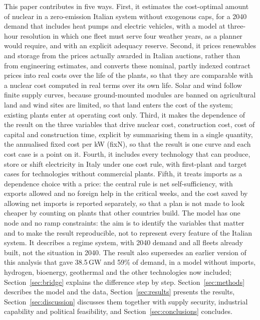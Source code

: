 This paper contributes in five ways. First, it estimates the cost-optimal amount of nuclear in a zero-emission Italian system without exogenous caps, for a 2040 demand that includes heat pumps and electric vehicles, with a model at three-hour resolution in which one fleet must serve four weather years, as a planner would require, and with an explicit adequacy reserve. Second, it prices renewables and storage from the prices actually awarded in Italian auctions, rather than from engineering estimates, and converts these nominal, partly indexed contract prices into real costs over the life of the plants, so that they are comparable with a nuclear cost computed in real terms over its own life. Solar and wind follow finite supply curves, because ground-mounted modules are banned on agricultural land and wind sites are limited, so that land enters the cost of the system; existing plants enter at operating cost only. Third, it makes the dependence of the result on the three variables that drive nuclear cost, construction cost, cost of capital and construction time, explicit by summarising them in a single quantity, the annualised fixed cost per kW (fixN), so that the result is one curve and each cost case is a point on it. Fourth, it includes every technology that can produce, store or shift electricity in Italy under one cost rule, with first-plant and target cases for technologies without commercial plants. Fifth, it treats imports as a dependence choice with a price: the central rule is net self-sufficiency, with exports allowed and no foreign help in the critical weeks, and the cost saved by allowing net imports is reported separately, so that a plan is not made to look cheaper by counting on plants that other countries build. The model has one node and no ramp constraints: the aim is to identify the variables that matter and to make the result reproducible, not to represent every feature of the Italian system. It describes a regime system, with 2040 demand and all fleets already built, not the situation in 2040. The result also supersedes an earlier version of this analysis that gave 38.5\,GW and 59\% of demand, in a model without imports, hydrogen, bioenergy, geothermal and the other technologies now included; Section~\ref{sec:bridge} explains the difference step by step. Section~\ref{sec:methods} describes the model and the data, Section~\ref{sec:results} presents the results, Section~\ref{sec:discussion} discusses them together with supply security, industrial capability and political feasibility, and Section~\ref{sec:conclusions} concludes.
